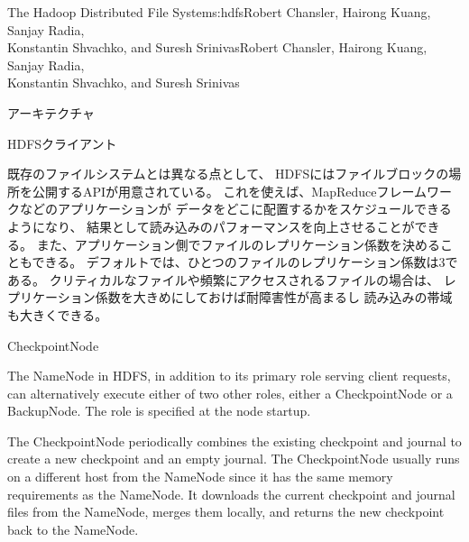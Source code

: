 \begin{aosachaptertoc}{The Hadoop Distributed File System}{s:hdfs}{Robert Chansler, Hairong Kuang, Sanjay Radia, \\ Konstantin Shvachko, and Suresh Srinivas}{Robert Chansler, Hairong Kuang, Sanjay Radia, \\ \hspace*{0.9cm} Konstantin Shvachko, and Suresh Srinivas}
\begin{aosasect1}{アーキテクチャ}
\begin{aosasect2}{HDFSクライアント}

既存のファイルシステムとは異なる点として、
HDFSにはファイルブロックの場所を公開するAPIが用意されている。
これを使えば、MapReduceフレームワークなどのアプリケーションが
データをどこに配置するかをスケジュールできるようになり、
結果として読み込みのパフォーマンスを向上させることができる。
また、アプリケーション側でファイルのレプリケーション係数を決めることもできる。
デフォルトでは、ひとつのファイルのレプリケーション係数は3である。
クリティカルなファイルや頻繁にアクセスされるファイルの場合は、
レプリケーション係数を大きめにしておけば耐障害性が高まるし
読み込みの帯域も大きくできる。

\end{aosasect2}

\begin{aosasect2}{CheckpointNode}

The NameNode in HDFS, in addition to its primary role serving client
requests, can alternatively execute either of two other roles, either
a CheckpointNode or a BackupNode. The role is specified at the node
startup.

The CheckpointNode periodically combines the existing checkpoint and
journal to create a new checkpoint and an empty journal. The
CheckpointNode usually runs on a different host from the NameNode
since it has the same memory requirements as the NameNode. It
downloads the current checkpoint and journal files from the NameNode,
merges them locally, and returns the new checkpoint back to the
NameNode.


\end{aosasect2}
\end{aosasect1}
\end{aosachaptertoc}
